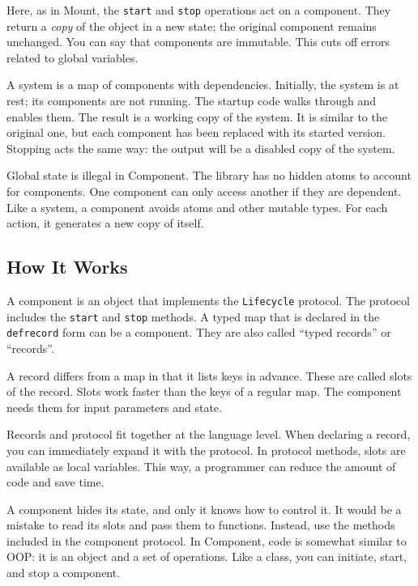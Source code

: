 
Here, as in Mount, the \verb|start| and \verb|stop| operations act on a component. They return a \emph{copy} of the object in a new state; the original component remains unchanged. You can say that components are immutable. This cuts off errors related to global variables.

A system is a map of components with dependencies. Initially, the system is at rest; its components are not running. The startup code walks through and enables them. The result is a working copy of the system. It is similar to the original one, but each component has been replaced with its started version. Stopping acts the same way: the output will be a disabled copy of the system.

Global state is illegal in Component. The library has no hidden atoms to account for components. One component can only access another if they are dependent. Like a system, a component avoids atoms and other mutable types. For each action, it generates a new copy of itself.

\subsection{How It Works}

\label{defrecord}

A component is an object that implements the \verb|Lifecycle| protocol. The protocol includes the \verb|start| and \verb|stop| methods. A typed map that is declared in the \verb|defrecord| form can be a component. They are also called “typed records” or “records”.


A record differs from a map in that it lists keys in advance. These are called slots of the record. Slots work faster than the keys of a regular map. The component needs them for input parameters and state.

Records and protocol fit together at the language level. When declaring a record, you can immediately expand it with the protocol. In protocol methods, slots are available as local variables. This way, a programmer can reduce the amount of code and save time.


A component hides its state, and only it knows how to control it. It would be a mistake to read its slots and pass them to functions. Instead, use the methods included in the component protocol. In Component, code is somewhat similar to OOP: it is an object and a set of operations. Like a class, you can initiate, start, and stop a component.

